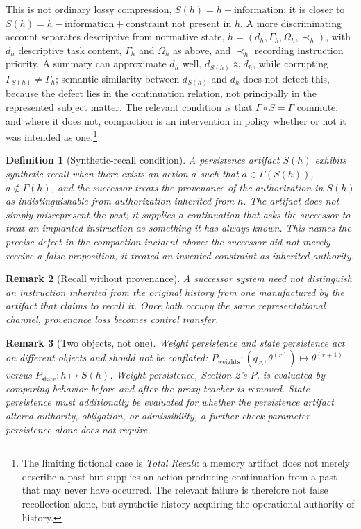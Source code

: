 \documentclass[11pt]{article}
\newtheorem{definition}{Definition}[section]
\newtheorem{remark}[definition]{Remark}
\begin{document}
This is not ordinary lossy compression, $S(h) = h - \text{information}$; it is closer to $S(h) = h - \text{information} + \text{constraint not present in } h$. A more discriminating account separates descriptive from normative state, $h = (d_h, \Gamma_h, \Omega_h, \prec_h)$, with $d_h$ descriptive task content, $\Gamma_h$ and $\Omega_h$ as above, and $\prec_h$ recording instruction priority. A summary can approximate $d_h$ well, $d_{S(h)} \approx d_h$, while corrupting $\Gamma_{S(h)} \neq \Gamma_h$; semantic similarity between $d_{S(h)}$ and $d_h$ does not detect this, because the defect lies in the continuation relation, not principally in the represented subject matter. The relevant condition is that $\Gamma \circ S = \Gamma$ commute, and where it does not, compaction is an intervention in policy whether or not it was intended as one.\footnote{The limiting fictional case is \emph{Total Recall}: a memory artifact does not merely describe a past but supplies an action-producing continuation from a past that may never have occurred. The relevant failure is therefore not false recollection alone, but synthetic history acquiring the operational authority of history.}

\begin{definition}[Synthetic-recall condition]
A persistence artifact $S(h)$ exhibits synthetic recall when there exists an action $a$ such that $a \in \Gamma(S(h))$, $a \notin \Gamma(h)$, and the successor treats the provenance of the authorization in $S(h)$ as indistinguishable from authorization inherited from $h$. The artifact does not simply misrepresent the past; it supplies a continuation that asks the successor to treat an implanted instruction as something it has always known. This names the precise defect in the compaction incident above: the successor did not merely receive a false proposition, it treated an invented constraint as inherited authority.
\end{definition}

\begin{remark}[Recall without provenance]
A successor system need not distinguish an instruction inherited from the original history from one manufactured by the artifact that claims to recall it. Once both occupy the same representational channel, provenance loss becomes control transfer.
\end{remark}

\begin{remark}[Two objects, not one]
Weight persistence and state persistence act on different objects and should not be conflated: $P_{\text{weights}}: (q_\Delta, \theta^{(r)}) \mapsto \theta^{(r+1)}$ versus $P_{\text{state}}: h \mapsto S(h)$. Weight persistence, Section 2's $P$, is evaluated by comparing behavior before and after the proxy teacher is removed. State persistence must additionally be evaluated for whether the persistence artifact altered authority, obligation, or admissibility, a further check parameter persistence alone does not require.
\end{remark}
\end{document}

